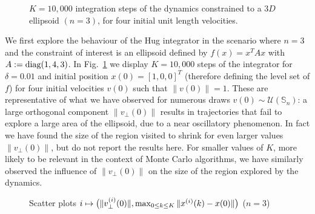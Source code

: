 \documentclass[10pt]{article}
\newcommand{\lyxdot}{.}
\begin{document}
\begin{figure}
\centering
{}


\caption{$K=10,000$ integration steps of the dynamics constrained to a $3D$
ellipsoid $(n=3)$, for four initial unit length velocities.}
\label{fig:3D-example-4-init-v}
\end{figure}





We first explore the behaviour of the Hug integrator in the scenario
where $n=3$ and the constraint of interest is an ellipsoid defined
by $f(x)=x^{T}Ax$ with $A:={\rm {\rm diag}}(1,4,3)$. In Fig.~\ref{fig:3D-example-4-init-v}
we display $K=10,000$ steps of the integrator for $\delta=0.01$
and initial position $x(0)=[1,0,0]^{T}$ (therefore defining the level
set of $f$) for four initial velocities $v(0)$ such that $\|v(0)\|=1$.
These are representative of what we have observed for numerous draws
$v(0)\sim\mathcal{U}(\mathbb{S}_{n})$: a large orthogonal component
$\|v_{\perp}(0)\|$ results in trajectories that fail to explore a
large area of the ellipsoid, due to a near oscillatory phenomenon.
In fact we have found the size of the region visited to shrink for
even larger values $\|v_{\perp}(0)\|$, but do not report the results
here. For smaller values of $K$, more likely to be relevant in the
context of Monte Carlo algorithms, we have similarly observed the
influence of $\|v_{\perp}(0)\|$ on the size of the region explored
by the dynamics.

\begin{figure}
\centering
{}


\caption{Scatter plots $i\protect\mapsto\big(\|v_{\perp}^{(i)}(0)\|,\max_{0\protect\leq k\protect\leq K}\|x^{(i)}(k)-x(0)\|\big)$
($n=3$)}
\label{fig:scatter-plots-3D}

\end{figure}
\end{document}

